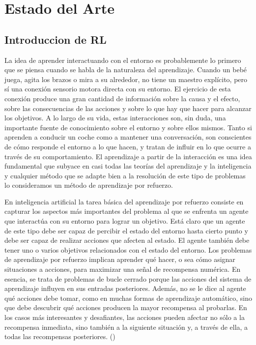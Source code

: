 \chapter{Estado del Arte}\label{chapter:state-of-the-art}

\section{Introduccion de RL}\label{section:state-of-the-art:introduction-to-RL}

La idea de aprender interactuando con el entorno es probablemente lo primero que se piensa cuando se habla de la naturaleza del aprendizaje. Cuando un bebé juega, agita los brazos o mira a su alrededor, no tiene un maestro explícito, pero sí una conexión sensorio motora directa con su entorno. El ejercicio de esta conexión produce una gran cantidad de información sobre la causa y el efecto, sobre las consecuencias de las acciones y sobre lo que hay que hacer para alcanzar los objetivos. A lo largo de su vida, estas interacciones son, sin duda, una importante fuente de conocimiento sobre el entorno y sobre ellos mismos. Tanto si aprenden a conducir un coche como a mantener una conversación, son conscientes de cómo responde el entorno a lo que hacen, y tratan de influir en lo que ocurre a través de su comportamiento. El aprendizaje a partir de la interacción es una idea fundamental que subyace en casi todas las teorías del aprendizaje y la inteligencia y cualquier método que se adapte bien a la resolución de este tipo de problemas lo consideramos un método de aprendizaje por refuerzo.

En inteligencia artificial la tarea básica del aprendizaje por refuerzo consiste en capturar los aspectos más importantes del problema al que se enfrenta un agente que interactúa con su entorno para lograr un objetivo. Está claro que un agente de este tipo debe ser capaz de percibir el estado del entorno hasta cierto punto y debe ser capaz de realizar acciones que afecten al estado. El agente también debe tener uno o varios objetivos relacionados con el estado del entorno. Los problemas de aprendizaje por refuerzo implican aprender qué hacer, o sea cómo asignar situaciones a acciones, para maximizar una señal de recompensa numérica. En esencia, se trata de problemas de bucle cerrado porque las acciones del sistema de aprendizaje influyen en sus entradas posteriores. Además, no se le dice al agente qué acciones debe tomar, como en muchas formas de aprendizaje automático, sino que debe descubrir qué acciones producen la mayor recompensa al probarlas. En los casos más interesantes y desafiantes, las acciones pueden afectar no sólo a la recompensa inmediata, sino también a la siguiente situación y, a través de ella, a todas las recompensas posteriores. (\cite{sutton1998introduction})

